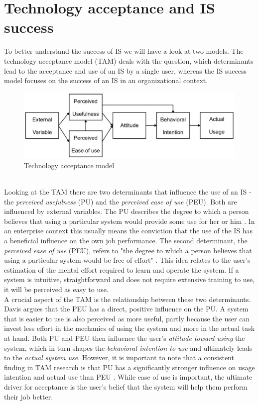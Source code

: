 \documentclass[
	english,
	ruledheaders=section,%
	class=report,%
	thesis={type=bachelor},%
	accentcolor=1b,%
	custommargins=true,%
	marginpar=false,%
	parskip=half-,%
	fontsize=11pt,%
	DIV=14,
]{tudapub}
\begin{document}
\section{Technology acceptance and IS success}
To better understand the success of IS we will have a look at two models. The technology acceptance model (TAM) deals with the question, which determinants lead to the acceptance and use of an IS by a single user, whereas the IS success model \parencite{DeloneMcLean2003ISSuccessTenYearUpdate} focuses on the success of an IS in an organizational context.
\begin{figure}[h!]
    \includegraphics[width=1\linewidth]{images/TAM.png}
    \caption{Technology acceptance model}
    \label{fig:enter-label}
\end{figure}
\\
Looking at the TAM there are two determinants that influence the use of an IS - the \textit{perceived usefulness} (PU) and the \textit{perceived ease of use} (PEU). Both are influenced by external variables. The PU describes the degree to which a person believes that using a particular system would provide some use for her or him \parencite{Davis1989MISQ}. In an enterprise context this usually means the conviction that the use of the IS has a beneficial influence on the own job performance. The second determinant, the \textit{perceived ease of use} (PEU), refers to "the degree to which a person believes that using a particular system would be free of effort" \parencite[p.~320]{Davis1989MISQ}. This idea relates to the user's estimation of the mental effort required to learn and operate the system. If a system is intuitive, straightforward and does not require extensive training to use, it will be perceived as easy to use.\\ A crucial aspect of the TAM is the relationship between these two determinants. Davis argues that the PEU has a direct, positive influence on the PU. A system that is easier to use is also perceived as more useful, partly because the user can invest less effort in the mechanics of using the system and more in the actual task at hand. Both PU and PEU then influence the user's \textit{attitude toward using} the system, which in turn shapes the \textit{behavioral intention to use} and ultimately leads to the \textit{actual system use}. However, it is important to note that a consistent finding in TAM research is that PU has a significantly stronger influence on usage intention and actual use than PEU \parencite{Davis1989MISQ}. While ease of use is important, the ultimate driver for acceptance is the user's belief that the system will help them perform their job better.\\
\end{document}
